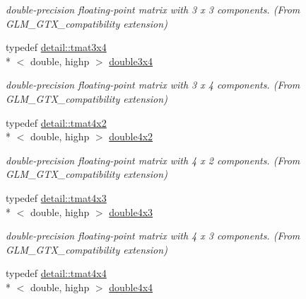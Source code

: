 \begin{DoxyCompactItemize}
\begin{DoxyCompactList}\small\item\em double-\/precision floating-\/point matrix with 3 x 3 components. (From G\-L\-M\-\_\-\-G\-T\-X\-\_\-compatibility extension) \end{DoxyCompactList}\item 
\hypertarget{group__gtx__compatibility_gab38107892c0116610e7de83126aff405}{typedef \hyperlink{structglm_1_1detail_1_1tmat3x4}{detail\-::tmat3x4}\\*
$<$ double, highp $>$ \hyperlink{group__gtx__compatibility_gab38107892c0116610e7de83126aff405}{double3x4}}\label{group__gtx__compatibility_gab38107892c0116610e7de83126aff405}

\begin{DoxyCompactList}\small\item\em double-\/precision floating-\/point matrix with 3 x 4 components. (From G\-L\-M\-\_\-\-G\-T\-X\-\_\-compatibility extension) \end{DoxyCompactList}\item 
\hypertarget{group__gtx__compatibility_ga816d1a516a5ec13511fe1ae703ddcf94}{typedef \hyperlink{structglm_1_1detail_1_1tmat4x2}{detail\-::tmat4x2}\\*
$<$ double, highp $>$ \hyperlink{group__gtx__compatibility_ga816d1a516a5ec13511fe1ae703ddcf94}{double4x2}}\label{group__gtx__compatibility_ga816d1a516a5ec13511fe1ae703ddcf94}

\begin{DoxyCompactList}\small\item\em double-\/precision floating-\/point matrix with 4 x 2 components. (From G\-L\-M\-\_\-\-G\-T\-X\-\_\-compatibility extension) \end{DoxyCompactList}\item 
\hypertarget{group__gtx__compatibility_ga1199ee41226db53d5f190d0628041845}{typedef \hyperlink{structglm_1_1detail_1_1tmat4x3}{detail\-::tmat4x3}\\*
$<$ double, highp $>$ \hyperlink{group__gtx__compatibility_ga1199ee41226db53d5f190d0628041845}{double4x3}}\label{group__gtx__compatibility_ga1199ee41226db53d5f190d0628041845}

\begin{DoxyCompactList}\small\item\em double-\/precision floating-\/point matrix with 4 x 3 components. (From G\-L\-M\-\_\-\-G\-T\-X\-\_\-compatibility extension) \end{DoxyCompactList}\item 
\hypertarget{group__gtx__compatibility_ga95e88bfe8dea34a6d4b30b1029c3e2da}{typedef \hyperlink{structglm_1_1detail_1_1tmat4x4}{detail\-::tmat4x4}\\*
$<$ double, highp $>$ \hyperlink{group__gtx__compatibility_ga95e88bfe8dea34a6d4b30b1029c3e2da}{double4x4}}\label{group__gtx__compatibility_ga95e88bfe8dea34a6d4b30b1029c3e2da}


\end{DoxyCompactItemize}
